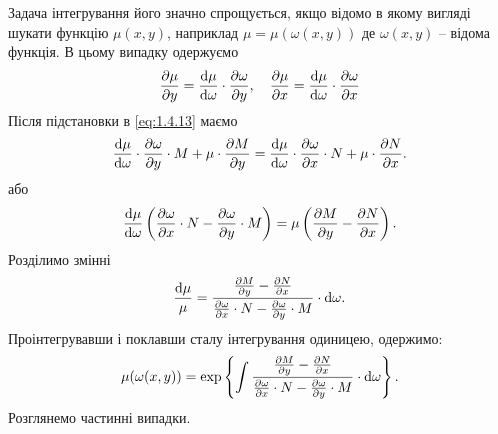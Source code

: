 Задача інтегрування його значно спрощується, якщо відомо в якому вигляді шукати функцію $\mu(x,y)$, наприклад $\mu = \mu(\omega(x,y))$ де $\omega(x,y)$ -- відома функція. В цьому випадку одержуємо
\begin{equation}
	\label{eq:1.4.14}
	\frac{\partial \mu}{\partial y} = \frac{\mathop{}\!\mathrm{d} \mu}{\mathop{}\!\mathrm{d} \omega} \cdot \frac{\partial \omega}{\partial y}, \quad \frac{\partial \mu}{\partial x} = \frac{\mathop{}\!\mathrm{d} \mu}{\mathop{}\!\mathrm{d} \omega} \cdot \frac{\partial \omega}{\partial x}
\end{equation}
Після підстановки в \eqref{eq:1.4.13} маємо
\begin{equation}
	\label{eq:1.4.15}
	\frac{\mathop{}\!\mathrm{d} \mu}{\mathop{}\!\mathrm{d} \omega} \cdot \frac{\partial \omega}{\partial y} \cdot M + \mu \cdot \frac{\partial M}{\partial y} = \frac{\mathop{}\!\mathrm{d} \mu}{\mathop{}\!\mathrm{d} \omega} \cdot \frac{\partial \omega}{\partial x} \cdot N + \mu \cdot \frac{\partial N}{\partial x}.
\end{equation}
або
\begin{equation}
	\label{eq:1.4.16}
	\frac{\mathop{}\!\mathrm{d} \mu}{\mathop{}\!\mathrm{d} \omega} \left( \frac{\partial \omega}{\partial x} \cdot N - \frac{\partial \omega}{\partial y} \cdot M \right) = \mu \left( \frac{\partial M}{\partial y} - \frac{\partial N}{\partial x} \right).
\end{equation}
Розділимо змінні
\begin{equation}
	\label{eq:1.4.17}
	\frac{\mathop{}\!\mathrm{d} \mu}{\mu} = \frac{\frac{\partial M}{\partial y} - \frac{\partial N}{\partial x} }{\frac{\partial \omega}{\partial x} \cdot N - \frac{\partial \omega}{\partial y} \cdot M} \cdot \mathop{}\!\mathrm{d} \omega.
\end{equation}
Проінтегрувавши і поклавши сталу інтегрування одиницею, одержимо:
\begin{equation}
	\label{eq:1.4.18}
	\mu(\omega(x,y)) = \exp\left\{\int \frac{\frac{\partial M}{\partial y} - \frac{\partial N}{\partial x} }{\frac{\partial \omega}{\partial x} \cdot N - \frac{\partial \omega}{\partial y} \cdot M} \cdot \mathop{}\!\mathrm{d} \omega\right\}.
\end{equation}
Розглянемо частинні випадки.
